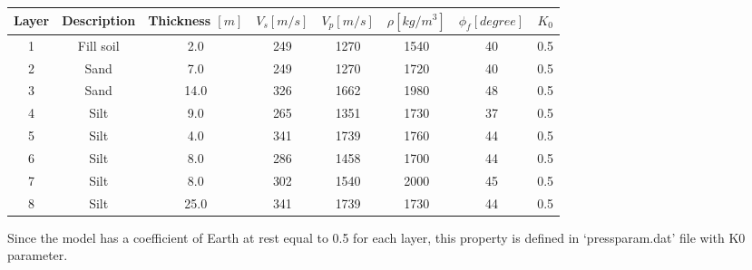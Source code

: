 \vspace{1cm}
\begin{center}
\begin{tabular}{|c|c|c|c|c|c|c|c|} \hline                                
Layer & Description  & Thickness $[m]$ & $V_{s} [m/s] $ &$V_{p} [m/s] $ & $\rho [kg/m^{3}]$ & $\phi_{f} [degree]$ & $K_{0}$ \\ \hline \hline 
1     & Fill soil    	& 2.0    	& 249  & 1270 	&  1540 & 40 & 0.5  \\ \hline    
2     & Sand    	& 7.0    	& 249  & 1270	&  1720 & 40 & 0.5  \\ \hline
3     & Sand	 	& 14.0   	& 326  & 1662 	&  1980 & 48 & 0.5  \\ \hline
4     & Silt 		& 9.0    	& 265  & 1351 	&  1730 & 37 & 0.5  \\ \hline
5     & Silt 		& 4.0    	& 341  & 1739 	&  1760 & 44 & 0.5  \\ \hline
6     & Silt 		& 8.0    	& 286  & 1458 	&  1700 & 44 & 0.5  \\ \hline
7     & Silt 		& 8.0    	& 302  & 1540 	&  2000 & 45 & 0.5  \\ \hline
8     & Silt 		& 25.0   	& 341  & 1739 	&  1730 & 44 & 0.5  \\ \hline
\end{tabular}
\label{KUSH2}
\end{center}


Since the model has a coefficient of Earth at rest equal to 0.5 for each layer, this property is defined in ‘pressparam.dat’ file with K0 parameter. \\
